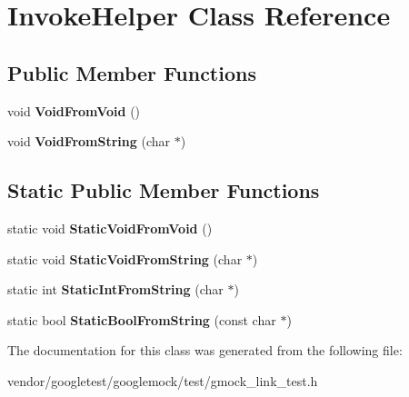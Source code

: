 \hypertarget{class_invoke_helper}{}\section{Invoke\+Helper Class Reference}
\label{class_invoke_helper}
\subsection*{Public Member Functions}
\begin{DoxyCompactItemize}
\item 
\mbox{\label{class_invoke_helper_a6371bcb64a8f01093f6fdef60776a031}} 
void {\bfseries Void\+From\+Void} ()
\item 
\mbox{\label{class_invoke_helper_a89f02dc384e6b5a7d935b7ea0a81cc9e}} 
void {\bfseries Void\+From\+String} (char $\ast$)
\end{DoxyCompactItemize}
\subsection*{Static Public Member Functions}
\begin{DoxyCompactItemize}
\item 
\mbox{\label{class_invoke_helper_ae96b5bd7c4fa328d0a87bc986f135fe8}} 
static void {\bfseries Static\+Void\+From\+Void} ()
\item 
\mbox{\label{class_invoke_helper_a5e95ce4214e89b180da9953d94396536}} 
static void {\bfseries Static\+Void\+From\+String} (char $\ast$)
\item 
\mbox{\label{class_invoke_helper_a5cfb11cca70ec5a9f59e8b7a4d4c2f85}} 
static int {\bfseries Static\+Int\+From\+String} (char $\ast$)
\item 
\mbox{\label{class_invoke_helper_aef16e38107cd8ddc0a52d7d0ab153211}} 
static bool {\bfseries Static\+Bool\+From\+String} (const char $\ast$)
\end{DoxyCompactItemize}


The documentation for this class was generated from the following file\+:\begin{DoxyCompactItemize}
\item 
vendor/googletest/googlemock/test/gmock\+\_\+link\+\_\+test.\+h\end{DoxyCompactItemize}
